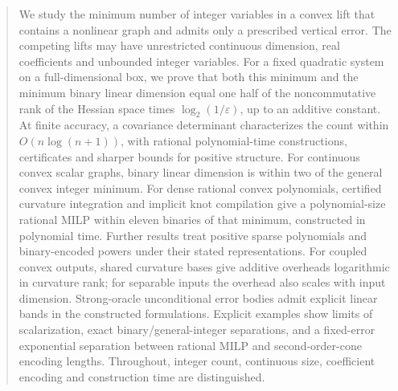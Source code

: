 \begin{abstract}
We study the minimum number of integer variables in a convex lift that
contains a nonlinear graph and admits only a prescribed vertical error.
The competing lifts may have unrestricted continuous dimension, real
coefficients and unbounded integer variables. For a fixed quadratic
system on a full-dimensional box, we prove that both this minimum and
the minimum binary linear dimension equal one half of the noncommutative
rank of the Hessian space times $\log_2(1/\varepsilon)$, up to an additive
constant. At finite accuracy, a covariance determinant characterizes the
count within $O(n\log(n+1))$, with rational polynomial-time constructions,
certificates and sharper bounds for positive structure. For continuous
convex scalar graphs, binary linear dimension is within two of the general
convex integer minimum. For dense rational convex polynomials, certified
curvature integration and implicit knot compilation give a polynomial-size
rational MILP within eleven binaries of that minimum, constructed in
polynomial time. Further results treat positive sparse polynomials and
binary-encoded powers under their stated representations. For coupled
convex outputs, shared curvature bases give additive overheads logarithmic
in curvature rank; for separable inputs the overhead also scales with input
dimension. Strong-oracle unconditional error bodies admit explicit linear
bands in the constructed formulations.
Explicit examples show limits of scalarization, exact binary/general-integer
separations, and a fixed-error exponential separation between rational
MILP and second-order-cone encoding lengths. Throughout, integer count,
continuous size, coefficient encoding and construction time are distinguished.
\end{abstract}
